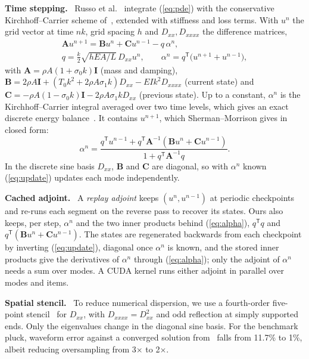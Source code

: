 \documentclass[a4paper]{article}
\newcommand{\head}[1]{\par\vspace{1pt}\noindent\textbf{#1.}\ \ignorespaces}
\begin{document}
\begin{sloppy}
\head{Time stepping}
Russo et al.~\cite{russo2026} integrate (\ref{eq:pde}) with the conservative
Kirchhoff--Carrier scheme of~\cite[Sec.~8.1.2]{bilbao2009}, extended with
stiffness and loss terms. With $u^{n}$ the grid vector at time $nk$, grid
spacing $h$ and $D_{xx},D_{xxxx}$ the difference matrices,
\begin{equation}
\begin{gathered}
\mathbf{A}u^{n+1}=\mathbf{B}u^{n}+\mathbf{C}u^{n-1}-q\,\alpha^n,\\
q=\tfrac{k}{2}\sqrt{hEA/L}\,D_{xx}u^{n},\qquad
\alpha^n=q^{\mathsf T}\big(u^{n+1}+u^{n-1}\big),
\end{gathered}
\label{eq:update}
\end{equation}
with $\mathbf{A}=\rho A(1+\sigma_0k)\mathbf{I}$ (mass and damping),
$\mathbf{B}=2\rho A\mathbf{I}+(T_0k^2+2\rho A\sigma_1k)D_{xx}-EIk^2D_{xxxx}$
(current state) and
$\mathbf{C}=-\rho A(1-\sigma_0k)\mathbf{I}-2\rho A\sigma_1kD_{xx}$ (previous
state). Up to a constant, $\alpha^n$ is the Kirchhoff--Carrier integral
averaged over two time levels, which gives an exact discrete energy
balance~\cite[eq.~8.9]{bilbao2009}. It contains $u^{n+1}$, which
Sherman--Morrison gives in closed form:
\begin{equation}
\alpha^n=\frac{q^{\mathsf T}u^{n-1}+q^{\mathsf T}\mathbf{A}^{-1}
 (\mathbf{B}u^{n}+\mathbf{C}u^{n-1})}{1+q^{\mathsf T}\mathbf{A}^{-1}q}.
\label{eq:alpha}
\end{equation}
In the discrete sine basis $D_{xx}$, $\mathbf{B}$ and $\mathbf{C}$ are
diagonal, so with $\alpha^n$ known (\ref{eq:update}) updates each mode
independently.

\head{Cached adjoint}
A \emph{replay adjoint} keeps $(u^{n},u^{n-1})$ at periodic checkpoints and
re-runs each segment on the reverse pass to recover its states. Ours also
keeps, per step, $\alpha^n$ and the two inner products behind
(\ref{eq:alpha}), $q^{\mathsf T}q$ and
$q^{\mathsf T}(\mathbf{B}u^{n}+\mathbf{C}u^{n-1})$. The states are
regenerated backwards from each checkpoint by inverting (\ref{eq:update}),
diagonal once $\alpha^n$ is known, and the stored inner
products give the derivatives of $\alpha^n$ through (\ref{eq:alpha}); only
the adjoint of $\alpha^n$ needs a sum over modes. A CUDA kernel runs
either adjoint in parallel over modes and items.

\head{Spatial stencil}
To reduce numerical dispersion, we use a fourth-order five-point
stencil~\cite[Sec.~6.3.1]{bilbao2009} for $D_{xx}$, with $D_{xxxx}=D_{xx}^2$
and odd reflection at simply supported ends. Only the eigenvalues change
in the diagonal sine basis. For the benchmark pluck, waveform error against
a converged solution from~\cite{russo2026} falls from 11.7\% to 1\%,
albeit reducing oversampling from 3$\times$ to 2$\times$.


\end{sloppy}
\end{document}
